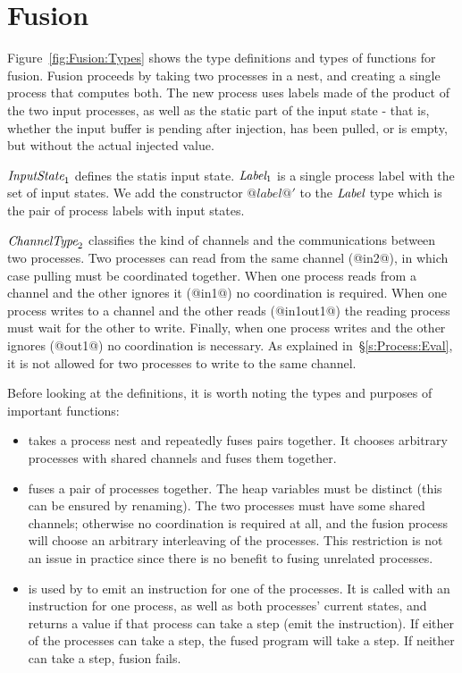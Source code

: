 \section{Fusion}
\label{s:Fusion}




Figure~\ref{fig:Fusion:Types} shows the type definitions and types of functions for fusion.
Fusion proceeds by taking two processes in a nest, and creating a single process that computes both.
The new process uses labels made of the product of the two input processes, as well as the static part of the input state - that is, whether the input buffer is pending after injection, has been pulled, or is empty, but without the actual injected value.


$\textit{InputState}_1$ defines the statis input state. $\textit{Label}_1$ is a single process label with the set of input states. We add the constructor $@label@'$ to the $\textit{Label}$ type which is the pair of process labels with input states.

$\textit{ChannelType}_2$ classifies the kind of channels and the communications between two processes.
Two processes can read from the same channel (@in2@), in which case pulling must be coordinated together.
When one process reads from a channel and the other ignores it (@in1@) no coordination is required.
When one process writes to a channel and the other reads (@in1out1@) the reading process must wait for the other to write.
Finally, when one process writes and the other ignores (@out1@) no coordination is necessary.
As explained in~\S\ref{s:Process:Eval}, it is not allowed for two processes to write to the same channel.

Before looking at the definitions, it is worth noting the types and purposes of important functions:
\begin{itemize}
\item
{} takes a process nest and repeatedly fuses pairs together. 
It chooses arbitrary processes with shared channels and fuses them together.

\item
{} fuses a pair of processes together.
The heap variables must be distinct (this can be ensured by renaming).
The two processes must have some shared channels; otherwise no coordination is required at all, and the fusion process will choose an arbitrary interleaving of the processes.
This restriction is not an issue in practice since there is no benefit to fusing unrelated processes.

\item
{} is used by  to emit an instruction for one of the processes.
It is called with an instruction for one process, as well as both processes' current states, and returns a value if that process can take a step (emit the instruction).
If either of the processes can take a step, the fused program will take a step.
If neither can take a step, fusion fails.
\end{itemize}


